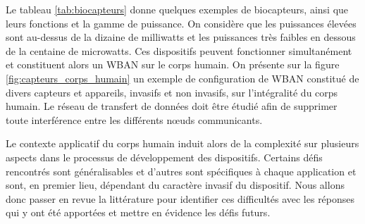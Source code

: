 Le tableau \ref{tab:biocapteurs} donne quelques exemples de biocapteurs, ainsi que leurs fonctions et la gamme de puissance. On considère que les puissances élevées sont au-dessus de la dizaine de milliwatts et les puissances très faibles en dessous de la centaine de microwatts. Ces dispositifs peuvent fonctionner simultanément et constituent alors un WBAN sur le corps humain. On présente sur la figure \ref{fig:capteurs_corps_humain} un exemple de configuration de WBAN constitué de divers capteurs et appareils, invasifs et non invasifs, sur l'intégralité du corps humain. Le réseau de transfert de données doit être étudié afin de supprimer toute interférence entre les différents n\oe{}uds communicants.

Le contexte applicatif du corps humain induit alors de la complexité sur plusieurs aspects dans le processus de développement des dispositifs. Certains défis rencontrés sont généralisables et d'autres sont spécifiques à chaque application et sont, en premier lieu, dépendant du caractère invasif du dispositif. Nous allons donc passer en revue la littérature pour identifier ces difficultés avec les réponses qui y ont été apportées et mettre en évidence les défis futurs.
